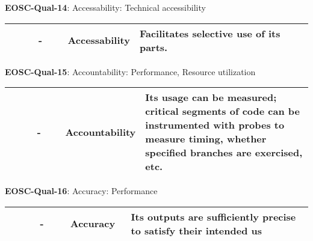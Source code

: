 \textbf{EOSC-Qual-14}: Accessability: Technical accessibility
\nopagebreak[4]
\begin{center}
    \tabletail{\hline}
    \tiny
    \begin{supertabular}{|p{0.10\linewidth}|p{0.10\linewidth}|p{0.20\linewidth}|p{0.60\linewidth}|} \hline
        \cite{boehm_quantitative_1976} & - & Accessability & Facilitates selective use of its parts.\\ \hline
    \end{supertabular}
\end{center}

\textbf{EOSC-Qual-15}: Accountability: Performance, Resource utilization
\nopagebreak[4]
\begin{center}
    \tabletail{\hline}
    \tiny
    \begin{supertabular}{|p{0.10\linewidth}|p{0.10\linewidth}|p{0.20\linewidth}|p{0.60\linewidth}|} \hline
        \cite{boehm_quantitative_1976} & - & Accountability & Its usage can be measured; critical segments of code can be instrumented with probes to measure timing, whether specified branches are exercised, etc.\\ \hline
    \end{supertabular}
\end{center}

\textbf{EOSC-Qual-16}: Accuracy: Performance
\nopagebreak[4]
\begin{center}
    \tabletail{\hline}
    \tiny
    \begin{supertabular}{|p{0.10\linewidth}|p{0.10\linewidth}|p{0.20\linewidth}|p{0.60\linewidth}|} \hline
        \cite{boehm_quantitative_1976} & - & Accuracy & Its outputs are sufficiently precise to satisfy their intended us\\ \hline
    \end{supertabular}
\end{center}

